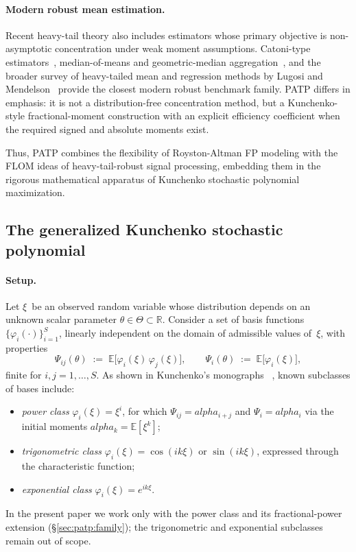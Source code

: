 \documentclass[11pt]{article}
\def\alpha{alpha}%
\theoremstyle{definition}
\newcommand{\E}{\mathbb{E}}
\begin{document}
\paragraph{Modern robust mean estimation.}
Recent heavy-tail theory also includes estimators whose primary objective is
non-asymptotic concentration under weak moment assumptions. Catoni-type
estimators~\citep{catoni2012challenging}, median-of-means and geometric-median
aggregation~\citep{minsker2015geometric}, and the broader survey of
heavy-tailed mean and regression methods by Lugosi and
Mendelson~\citep{lugosi2019survey} provide the closest modern robust
benchmark family. PATP differs in emphasis: it is not a distribution-free
concentration method, but a Kunchenko-style fractional-moment construction
with an explicit efficiency coefficient when the required signed and absolute
moments exist.

Thus, PATP combines the flexibility of Royston-Altman FP modeling with the
FLOM ideas of heavy-tail-robust signal processing, embedding them in the
rigorous mathematical apparatus of Kunchenko stochastic polynomial
maximization.

\subsection{The generalized Kunchenko stochastic polynomial}\label{sec:bg:generalized}

\paragraph{Setup.}
Let $\xi$~be an observed random variable whose distribution depends on an
unknown scalar parameter $\theta \in \Theta \subset \mathbb{R}$.
Consider a set of basis functions $\{\varphi_i(\cdot)\}_{i=1}^{S}$,
linearly independent on the domain of admissible values of~$\xi$, with
properties
\begin{equation}\label{eq:psi-def}
  \Psi_{ij}(\theta) \;:=\; \E\bigl[\varphi_i(\xi)\,\varphi_j(\xi)\bigr],
  \qquad
  \Psi_i(\theta) \;:=\; \E\bigl[\varphi_i(\xi)\bigr],
\end{equation}
finite for $i, j = 1, \ldots, S$. As shown in Kunchenko's monographs
~\citep{kunchenko2005poligen,kunchenko2006stochastic}, known
subclasses of bases include:

\begin{itemize}
  \item \emph{power class} $\varphi_i(\xi) = \xi^i$, for which
        $\Psi_{ij} = \alpha_{i+j}$ and $\Psi_i = \alpha_i$ via the initial
        moments $\alpha_k = \E[\xi^k]$;
  \item \emph{trigonometric class} $\varphi_i(\xi) = \cos(ik\xi)$ or
        $\sin(ik\xi)$, expressed through the characteristic function;
  \item \emph{exponential class} $\varphi_i(\xi) = e^{ik\xi}$.
\end{itemize}
In the present paper we work only with the power class and its
fractional-power extension (\S\ref{sec:patp:family}); the trigonometric
and exponential subclasses remain out of scope.
\end{document}
